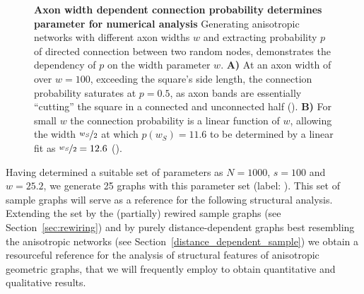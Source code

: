 \begin{figure}[htp]
  \centering
  \vspace{-0.15cm}
  \caption{\textbf{Axon width dependent connection probability
      determines parameter for numerical analysis} Generating
    anisotropic networks with different axon widths $w$ and extracting
    probability $p$ of directed connection between two random nodes,
    demonstrates the dependency of $p$ on the width parameter $w$.
    \textbf{A)} At an axon width of over $w=100$, exceeding the
    square's side length, the connection probability saturates at
    $p=0.5$, as axon bands are essentially \enquote{cutting} the
    square in a connected and unconnected half
    (). \textbf{B)} For small $w$ the connection
    probability is a linear function of $w$, allowing the width $\nicefrac{w_S}{2}$
    at which $p(w_S)=11.6$ to be determined by a linear fit as
    $\nicefrac{w_S}{2} =
    12.6$ ().} %
  \label{fig:determine_axon_width}
\end{figure}



\label{sample_graphs}Having determined a suitable set of parameters as
$N=1000$, $s=100$ and $w=25.2$, we generate 25 graphs with this parameter
set (label: ).
This set of sample graphs will serve as a reference for the following
structural analysis. Extending the set by the (partially) rewired
sample graphs (see Section~\ref{sec:rewiring}) and by purely
distance-dependent graphs best resembling the anisotropic networks
(see Section~\ref{distance_dependent_sample}) we obtain a resourceful
reference for the analysis of structural features of anisotropic
geometric graphs, that we will frequently employ to obtain
quantitative and qualitative results.













